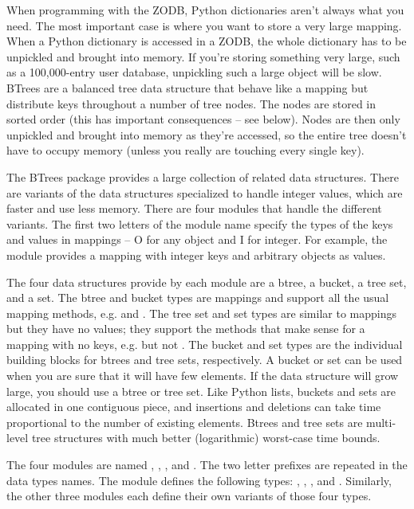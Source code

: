 When programming with the ZODB, Python dictionaries aren't always what
you need.  The most important case is where you want to store a very
large mapping.  When a Python dictionary is accessed in a ZODB, the
whole dictionary has to be unpickled and brought into memory.  If
you're storing something very large, such as a 100,000-entry user
database, unpickling such a large object will be slow.  BTrees are a
balanced tree data structure that behave like a mapping but distribute
keys throughout a number of tree nodes.  The nodes are stored in
sorted order (this has important consequences -- see below).  Nodes are
then only unpickled and brought into memory as they're accessed, so the
entire tree doesn't have to occupy memory (unless you really are
touching every single key).

The BTrees package provides a large collection of related data
structures.  There are variants of the data structures specialized to
handle integer values, which are faster and use less memory.  There
are four modules that handle the different variants.  The first two
letters of the module name specify the types of the keys and values in
mappings -- O for any object and I for integer.  For example, the
 module provides a mapping with integer
keys and arbitrary objects as values.

The four data structures provide by each module are a btree, a bucket,
a tree set, and a set.  The btree and bucket types are mappings and
support all the usual mapping methods, e.g.  and
.  The tree set and set types are similar to mappings
but they have no values; they support the methods that make sense for
a mapping with no keys, e.g.  but not
.  The bucket and set types are the individual
building blocks for btrees and tree sets, respectively.  A bucket or
set can be used when you are sure that it will have few elements.  If
the data structure will grow large, you should use a btree or tree
set.  Like Python lists, buckets and sets are allocated in one
contiguous piece, and insertions and deletions can take time
proportional to the number of existing elements.  Btrees and tree sets
are multi-level tree structures with much better (logarithmic) worst-case
time bounds.

The four modules are named , ,
, and .  The two letter prefixes are
repeated in the data types names.  The  module
defines the following types: , ,
, and .  Similarly, the other three modules
each define their own variants of those four types.

